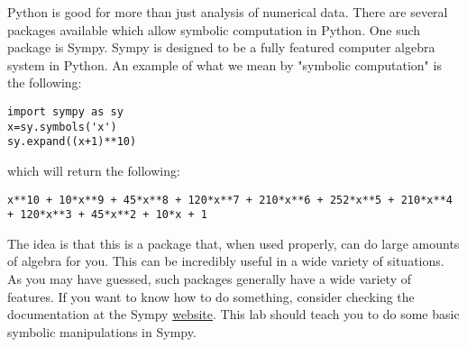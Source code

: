 \label{lab:Sympy}


Python is good for more than just analysis of numerical data.
There are several packages available which allow symbolic computation in Python.
One such package is Sympy.
Sympy is designed to be a fully featured computer algebra system in Python.
An example of what we mean by "symbolic computation" is the following:
\begin{lstlisting}
import sympy as sy
x=sy.symbols('x')
sy.expand((x+1)**10)
\end{lstlisting}
which will return the following:
\begin{lstlisting}
x**10 + 10*x**9 + 45*x**8 + 120*x**7 + 210*x**6 + 252*x**5 + 210*x**4 + 120*x**3 + 45*x**2 + 10*x + 1
\end{lstlisting}
The idea is that this is a package that, when used properly, can do large amounts of algebra for you.
This can be incredibly useful in a wide variety of situations.
As you may have guessed, such packages generally have a wide variety of features. 
If you want to know how to do something, consider checking the documentation  at the Sympy \href{http://sympy.org/en/index.htmll}{website}.
This lab should teach you to do some basic symbolic manipulations in Sympy.

